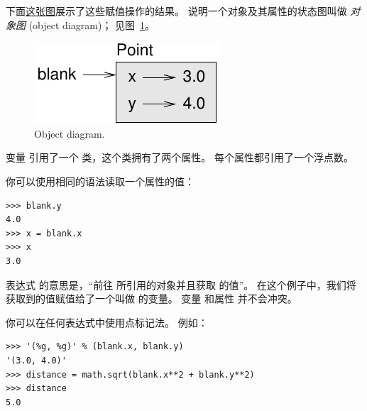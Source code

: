 下面\hyperref[fig.point]{这张图}展示了这些赋值操作的结果。 说明一个对象及其属性的状态图叫做 {\em 对象图} (object diagram)； 见图~\ref{fig.point}。

  
  

\begin{figure}
\centerline
{\includegraphics[scale=0.8]{../source/figs/point.pdf}}
\caption{Object diagram.}
\label{fig.point}
\end{figure}


变量  引用了一个  类，这个类拥有了两个属性。
每个属性都引用了一个浮点数。


你可以使用相同的语法读取一个属性的值：

\begin{lstlisting}
>>> blank.y
4.0
>>> x = blank.x
>>> x
3.0
\end{lstlisting}

%

表达式  的意思是，``前往  所引用的对象并且获取  的值''。
在这个例子中，我们将获取到的值赋值给了一个叫做  的变量。
变量  和属性  并不会冲突。


你可以在任何表达式中使用点标记法。 例如：

\begin{lstlisting}
>>> '(%g, %g)' % (blank.x, blank.y)
'(3.0, 4.0)'
>>> distance = math.sqrt(blank.x**2 + blank.y**2)
>>> distance
5.0
\end{lstlisting}

